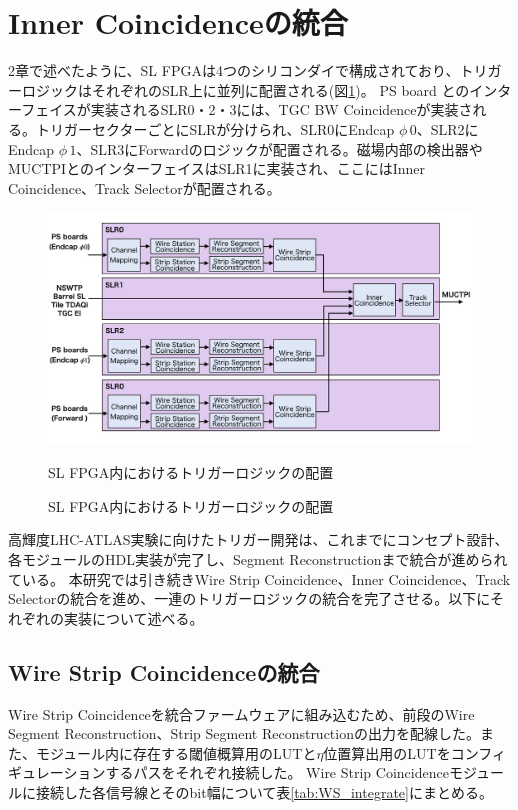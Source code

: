 \clearpage
\section{Inner Coincidenceの統合}
\label{sec_TriggerIntegration}
2章で述べたように、SL FPGAは4つのシリコンダイで構成されており、トリガーロジックはそれぞれのSLR上に並列に配置される(図\ref{Trigger_floor})。
PS board とのインターフェイスが実装されるSLR0・2・3には、TGC BW Coincidenceが実装される。トリガーセクターごとにSLRが分けられ、SLR0にEndcap $\phi\,0$、SLR2にEndcap $\phi\,1$、SLR3にForwardのロジックが配置される。磁場内部の検出器やMUCTPIとのインターフェイスはSLR1に実装され、ここにはInner Coincidence、Track Selectorが配置される。

\begin{figure} 
\centering
\includegraphics[width=16cm]{fig/SL/Trigger_floor.png}
\caption{SL FPGA内におけるトリガーロジックの配置}{SL FPGA内におけるトリガーロジックの配置}
\label{Trigger_floor}
\end{figure}

高輝度LHC-ATLAS実験に向けたトリガー開発は、これまでにコンセプト設計、各モジュールのHDL実装が完了し、Segment Reconstructionまで統合が進められている。
本研究では引き続きWire Strip Coincidence、Inner Coincidence、Track Selectorの統合を進め、一連のトリガーロジックの統合を完了させる。以下にそれぞれの実装について述べる。

\subsection{Wire Strip Coincidenceの統合}
Wire Strip Coincidenceを統合ファームウェアに組み込むため、前段のWire Segment Reconstruction、Strip Segment Reconstructionの出力を配線した。また、モジュール内に存在する\pt  閾値概算用のLUTと$\eta$位置算出用のLUTをコンフィギュレーションするパスをそれぞれ接続した。
Wire Strip Coincidenceモジュールに接続した各信号線とそのbit幅について表\ref{tab:WS_integrate}にまとめる。

